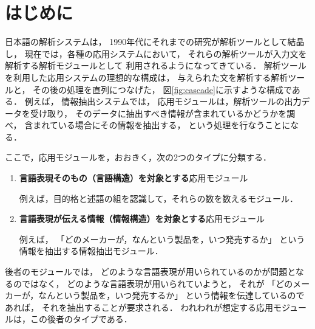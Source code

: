 \documentclass[japanese]{jnlp_1.3e}
\begin{document}
\maketitle




\section{はじめに}
\label{sec:intro}

日本語の解析システムは，
1990年代にそれまでの研究が解析ツールとして結晶し，
現在では，各種の応用システムにおいて，
それらの解析ツールが入力文を解析する解析モジュールとして
利用されるようになってきている．
解析ツールを利用した応用システムの理想的な構成は，
与えられた文を解析する解析ツールと，
その後の処理を直列につなげた，
図\ref{fig:cascade}に示すような構成である．
例えば，
情報抽出システムでは，
応用モジュールは，解析ツールの出力データを受け取り，
そのデータに抽出すべき情報が含まれているかどうかを調べ，
含まれている場合にその情報を抽出する，
という処理を行なうことになる．
\begin{figure}[b]

\end{figure}

ここで，応用モジュールを，おおきく，次の2つのタイプに分類する．
\begin{enumerate}
\item {\bf 言語表現そのもの（言語構造）を対象とする}応用モジュール

      例えば，目的格と述語の組を認識して，それらの数を数えるモジュール．
\item {\bf 言語表現が伝える情報（情報構造）を対象とする}応用モジュール

      例えば，
      「どのメーカーが，なんという製品を，いつ発売するか」
      という情報を抽出する情報抽出モジュール．
\end{enumerate}
後者のモジュールでは，
どのような言語表現が用いられているのかが問題となるのではなく，
どのような言語表現が用いられていようと，
それが
「どのメーカーが，なんという製品を，いつ発売するか」
という情報を伝達しているのであれば，
それを抽出することが要求される．
われわれが想定する応用モジュールは，この後者のタイプである．
\end{document}
